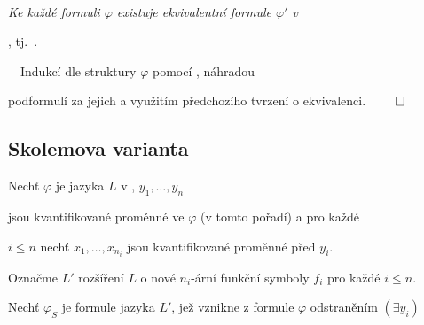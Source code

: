     \ \ {\it Ke každé formuli $\varphi$ existuje ekvivalentní formule $\varphi'$ v 
    \smallskip
    
    , tj.\ .}
    \medskip
    
    \ \ Indukcí dle struktury $\varphi$ pomocí , náhradou
    \smallskip
    
    podformulí za jejich  a využitím předchozího tvrzení o ekvivalenci. $\qed$
    \vspace{-1mm}
    
    
    \vspace{-10mm}
    

\subsection{Skolemova varianta}\todo


Nechť $\varphi$ je  jazyka $L$ v , $y_1,\dots,y_n$
\smallskip

jsou  kvantifikované proměnné ve $\varphi$ (v tomto pořadí) a pro každé
\smallskip

$i\le n$ nechť $x_1,\dots,x_{n_i}$ jsou  kvantifikované proměnné před $y_i$.
\smallskip

Označme $L'$ rozšíření $L$ o nové $n_i$-ární funkční symboly $f_i$ pro každé $i\le n$.
\bigskip

Nechť $\varphi_S$ je formule jazyka $L'$, jež vznikne z formule $\varphi$ odstraněním $(\exists y_i)$
\smallskip

